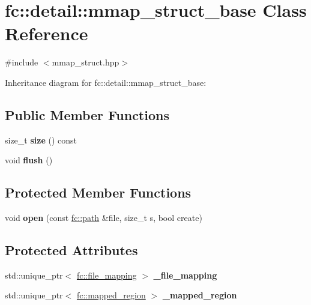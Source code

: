 \hypertarget{classfc_1_1detail_1_1mmap__struct__base}{}\section{fc\+:\+:detail\+:\+:mmap\+\_\+struct\+\_\+base Class Reference}
\label{classfc_1_1detail_1_1mmap__struct__base}


{\ttfamily \#include $<$mmap\+\_\+struct.\+hpp$>$}



Inheritance diagram for fc\+:\+:detail\+:\+:mmap\+\_\+struct\+\_\+base\+:
\subsection*{Public Member Functions}
\begin{DoxyCompactItemize}
\item 
\mbox{\label{classfc_1_1detail_1_1mmap__struct__base_a21fe0dadcd678e4ed9fc839265cab733}} 
size\+\_\+t {\bfseries size} () const
\item 
\mbox{\label{classfc_1_1detail_1_1mmap__struct__base_a3711d51c2211d55864a8c8b83e2bf811}} 
void {\bfseries flush} ()
\end{DoxyCompactItemize}
\subsection*{Protected Member Functions}
\begin{DoxyCompactItemize}
\item 
\mbox{\label{classfc_1_1detail_1_1mmap__struct__base_a0328d6168aaa14fa81db688b623def57}} 
void {\bfseries open} (const \mbox{\hyperlink{classfc_1_1path}{fc\+::path}} \&file, size\+\_\+t s, bool create)
\end{DoxyCompactItemize}
\subsection*{Protected Attributes}
\begin{DoxyCompactItemize}
\item 
\mbox{\label{classfc_1_1detail_1_1mmap__struct__base_ae2fbc74484eb156d0ce6ec7c6c2aa90d}} 
std\+::unique\+\_\+ptr$<$ \mbox{\hyperlink{classfc_1_1file__mapping}{fc\+::file\+\_\+mapping}} $>$ {\bfseries \+\_\+file\+\_\+mapping}
\item 
\mbox{\label{classfc_1_1detail_1_1mmap__struct__base_abbe030f02ae317c8044b14dbd3e9a001}} 
std\+::unique\+\_\+ptr$<$ \mbox{\hyperlink{classfc_1_1mapped__region}{fc\+::mapped\+\_\+region}} $>$ {\bfseries \+\_\+mapped\+\_\+region}
\end{DoxyCompactItemize}


